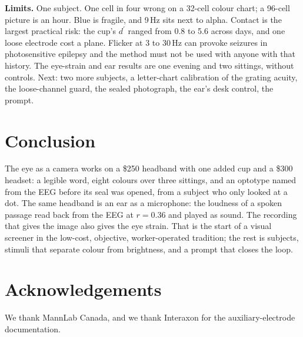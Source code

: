 \documentclass[conference]{IEEEtran}
\newif\ifnotes \notesfalse
\newcommand{\rf}[1]{\ifnotes\textcolor{blue}{[RF: #1]}\fi}
\newcommand{\dprime}{d^{\prime}}
\begin{document}
\textbf{Limits.} One subject. One cell in four wrong on a 32-cell colour chart; a 96-cell picture is an hour. Blue is fragile, and 9\,Hz sits next to alpha. Contact is the largest practical risk: the cup's $\dprime$ ranged from 0.8 to 5.6 across days, and one loose electrode cost a plane. Flicker at 3 to 30\,Hz can provoke seizures in photosensitive epilepsy and the method must not be used with anyone with that history. The eye-strain and ear results are one evening and two sittings, without controls. \rf{field constraints: time per subject, lighting, who holds the laptop} Next: two more subjects, a letter-chart calibration of the grating acuity, the loose-channel guard, the sealed photograph, the ear's desk control, the prompt.

\section{Conclusion}

The eye as a camera works on a \$250 headband with one added cup and a \$300 headset: a legible word, eight colours over three sittings, and an optotype named from the EEG before its seal was opened, from a subject who only looked at a dot. The same headband is an ear as a microphone: the loudness of a spoken passage read back from the EEG at $r = 0.36$ and played as sound. The recording that gives the image also gives the eye strain. That is the start of a visual screener in the low-cost, objective, worker-operated tradition; the rest is subjects, stimuli that separate colour from brightness, and a prompt that closes the loop.

\section*{Acknowledgements}
We thank MannLab Canada, and we thank Interaxon for the auxiliary-electrode documentation.



\end{document}
